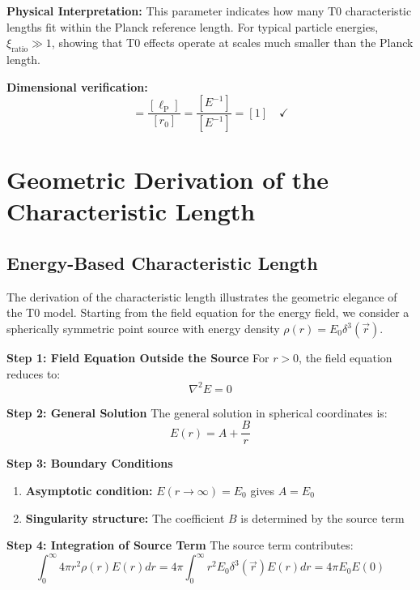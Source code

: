 \documentclass[12pt,a4paper]{report}
\newcommand{\lP}{\ell_{\text{P}}}         %
\newcommand{\rzero}{r_0}                  %
\newcommand{\xirat}{\xi_{\text{ratio}}}   %
\begin{document}
\textbf{Physical Interpretation:} This parameter indicates how many T0 characteristic lengths fit within the Planck reference length. For typical particle energies, $\xirat \gg 1$, showing that T0 effects operate at scales much smaller than the Planck length.

\textbf{Dimensional verification:}
\begin{equation}
	[\xi] = \frac{[\lP]}{[\rzero]} = \frac{[E^{-1}]}{[E^{-1}]} = [1] \quad \checkmark
\end{equation}
	\section{Geometric Derivation of the Characteristic Length}\label{sec:geometric_derivation}
	
	\subsection{Energy-Based Characteristic Length}\label{subsec:energy_based_length}
	
	The derivation of the characteristic length illustrates the geometric elegance of the T0 model. Starting from the field equation for the energy field, we consider a spherically symmetric point source with energy density $\rho(r) = E_0 \delta^3(\vec{r})$.
	
	\textbf{Step 1: Field Equation Outside the Source}
	For $r > 0$, the field equation reduces to:
	\begin{equation}
		\nabla^2 E = 0
		\label{eq:laplace_outside}
	\end{equation}
	
	\textbf{Step 2: General Solution}
	The general solution in spherical coordinates is:
	\begin{equation}
		E(r) = A + \frac{B}{r}
		\label{eq:general_solution}
	\end{equation}
	
	\textbf{Step 3: Boundary Conditions}
	\begin{enumerate}
		\item \textbf{Asymptotic condition:} $E(r \to \infty) = E_0$ gives $A = E_0$
		\item \textbf{Singularity structure:} The coefficient $B$ is determined by the source term
	\end{enumerate}
	
	\textbf{Step 4: Integration of Source Term}
	The source term contributes:
	\begin{equation}
		\int_0^{\infty} 4\pi r^2 \rho(r) E(r) dr = 4\pi \int_0^{\infty} r^2 E_0 \delta^3(\vec{r}) E(r) dr = 4\pi E_0 E(0)
	\end{equation}
	
\end{document}
